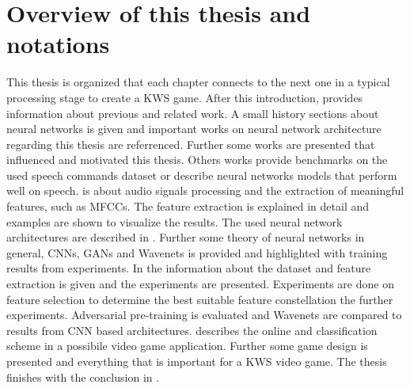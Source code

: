 
\section{Overview of this thesis and notations}\label{sec:intro_overview}
\thesisStateReady
This thesis is organized that each chapter connects to the next one in a typical processing stage to create a KWS game.
After this introduction,  provides information about previous and related work.
A small history sections about neural networks is given and important works on neural network architecture regarding this thesis are referrenced.
Further some works are presented that influenced and motivated this thesis.
Others works provide benchmarks on the used speech commands dataset or describe neural networks models that perform well on speech.
 is about audio signals processing and the extraction of meaningful features, such as MFCCs.
The feature extraction is explained in detail and examples are shown to visualize the results.
The used neural network architectures are described in . 
Further some theory of neural networks in general, CNNs, GANs and Wavenets is provided and highlighted with training results from experiments.
In the  information about the dataset and feature extraction is given and the experiments are presented.
Experiments are done on feature selection to determine the best suitable feature constellation the further experiments.
Adversarial pre-training is evaluated and Wavenets are compared to results from CNN based architectures.
 describes the online and classification scheme in a possibile video game application.
Further some game design is presented and everything that is important for a KWS video game.
The thesis finishes with the conclusion in .



